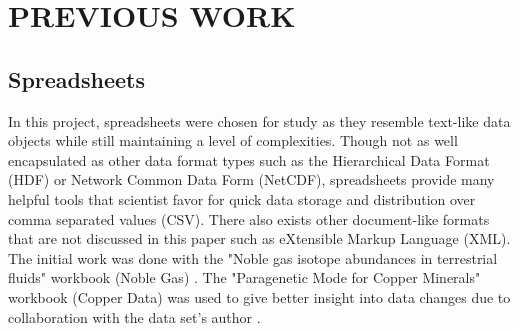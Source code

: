 
\chapter{PREVIOUS WORK}
\section{Spreadsheets}

In this project, spreadsheets were chosen for study as they resemble text-like data objects while still maintaining a level of complexities.
Though not as well encapsulated as other data format types such as the Hierarchical Data Format (HDF) or Network Common Data Form (NetCDF), spreadsheets provide many helpful tools that scientist favor for quick data storage and distribution over comma separated values (CSV).
There also exists other document-like formats that are not discussed in this paper such as eXtensible Markup Language (XML).
The initial work was done with the "Noble gas isotope abundances in terrestrial fluids" workbook (Noble Gas) \cite{Polyak2015}.
The "Paragenetic Mode for Copper Minerals" workbook (Copper Data) was used to give better insight into data changes due to collaboration with the data set's author \cite{Morrison2016}.

